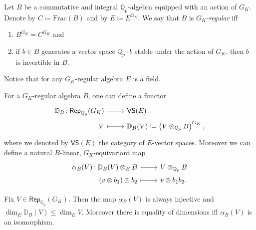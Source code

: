 \begin{defn}
	Let $B$ be a commutative and integral $\mathbb{Q}_p$-algebra
	equipped with an action of $G_K$.
	Denote by $C \coloneqq \mathrm{Frac}(B)$ and by $E \coloneqq E^{G_K}$.
	We say that $B$ is {\em $G_K$-regular} iff
\begin{enumerate}
	\item $B^{G_K} = C^{G_K}$ and
	\item if $b \in B$ generates a vector space $\mathbb{Q}_p \cdot b$
		stable under the action of $G_K$, then $b$ is invertible in $B$.
\end{enumerate}
\end{defn}


\begin{rem}[]
	Notice that for any $G_K$-regular algebra $E$ is a field.
\end{rem}


\begin{defn}[]
	For a $G_K$-regular algebra $B$, one can define a
	functor
	\begin{equation*}
	\begin{tikzcd}[row sep = 0ex
		,/tikz/column 1/.append style={anchor=base east}
		,/tikz/column 2/.append style={anchor=base west}]
		\mathbb{D}_B\colon \mathsf{Rep}_{\mathbb{Q}_p}(G_K) \arrow[r, "", rightarrow] &
		\mathsf{VS}(E) \\
		V \arrow[r, "", mapsto] & 
		\mathbb{D}_B(V) \coloneqq \left( V \otimes_{\mathbb{Q}_p} B \right)^{G_K}
	,\end{tikzcd}
	\end{equation*} 
	where we denoted by $\mathsf{VS}(E)$ the category of $E$-vector spaces.
	Moreover we can define a natural $B$-linear, $G_K$-equivariant map
	\begin{equation*}
	\begin{tikzcd}[row sep = 0ex
		,/tikz/column 1/.append style={anchor=base east}
		,/tikz/column 2/.append style={anchor=base west}]
		\alpha_B(V)\colon 
		\mathbb{D}_B(V) \otimes_E B\arrow[r, "", rightarrow] &
		V \otimes_{\mathbb{Q}_p} B \\
		\left( v \otimes b_1 \right) \otimes b_2 \arrow[r, "", mapsto] & 
		v \otimes b_1b_2
	.\end{tikzcd}
	\end{equation*}
\end{defn}


\begin{prop}
	Fix $V \in \mathsf{Rep}_{\mathbb{Q}_p}(G_K)$.
	Then the map $\alpha_B(V)$ is always injective and
	$\dim_E \mathbb{D}_B(V) \leq \dim_E V$.
	Moreover there is equality of dimensions iff $\alpha_B(V)$ is an isomorphism.
\end{prop}


